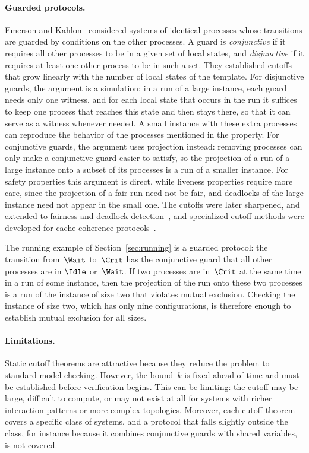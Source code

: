 \paragraph{Guarded protocols.}
Emerson and Kahlon~\cite{EK00} considered systems of identical processes whose
transitions are guarded by conditions on the other processes. A guard is
\emph{conjunctive} if it requires all other processes to be in a given set of
local states, and \emph{disjunctive} if it requires at least one other process
to be in such a set. They established cutoffs that grow linearly with the
number of local states of the template. For disjunctive guards, the argument
is a simulation: in a run of a large instance, each guard needs only one
witness, and for each local state that occurs in the run it suffices to keep
one process that reaches this state and then stays there, so that it can serve
as a witness whenever needed. A small instance with these extra processes can
reproduce the behavior of the processes mentioned in the property. For conjunctive guards, the argument uses projection instead:
removing processes can only make a conjunctive guard easier to satisfy, so the
projection of a run of a large instance onto a subset of its processes is a
run of a smaller instance. For safety properties this argument is direct,
while liveness properties require more care, since the projection of a fair
run need not be fair, and deadlocks of the large instance need not appear in
the small one. The cutoffs were later sharpened, and extended to fairness and
deadlock detection~\cite{AJK16}, and specialized cutoff methods were developed
for cache coherence protocols~\cite{EK03}.

The running example of Section~\ref{sec:running} is a guarded protocol: the
transition from~$\Wait$ to~$\Crit$ has the conjunctive guard that all other
processes are in $\Idle$ or~$\Wait$. If two processes are in~$\Crit$ at the
same time in a run of some instance, then the projection of the run onto these
two processes is a run of the instance of size two that violates mutual
exclusion. Checking the instance of size two, which has only nine
configurations, is therefore enough to establish mutual exclusion for all
sizes.

\paragraph{Limitations.}
Static cutoff theorems are attractive because they reduce the problem to
standard model checking. However, the bound~$k$ is fixed ahead of time and must
be established before verification begins. This can be limiting: the cutoff
may be large, difficult to compute, or may not exist at all for systems with
richer interaction patterns or more complex topologies. Moreover, each cutoff
theorem covers a specific class of systems, and a protocol that falls slightly
outside the class, for instance because it combines conjunctive guards with
shared variables, is not covered.

